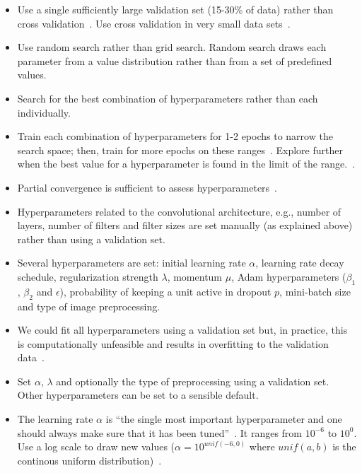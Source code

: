 \begin{itemize}
	\item Use a single sufficiently large validation set (15-30\% of data) rather than cross validation~\cite{Bengio2014}. Use cross validation in very small data sets~\cite{Ng2014}.

	\item Use random search rather than grid search. Random search draws each parameter from a value distribution rather than from a set of predefined values.~\cite{Bergstra2012}

	\item Search for the best combination of hyperparameters rather than each individually.

	\item Train each combination of hyperparameters for 1-2 epochs to narrow the search space; then, train for more epochs on these ranges~\cite{Karpathy2016}. Explore further when the best value for a hyperparameter is found in the limit of the range.~\cite{Bengio2012}.

	\item Partial convergence is sufficient to assess hyperparameters~\cite{Karpathy2016}.

	\item Hyperparameters related to the convolutional architecture, e.g., number of layers, number of filters and filter sizes are set manually (as explained above) rather than using a validation set.

	\item Several hyperparameters are set: initial learning rate $\alpha$, learning rate decay schedule, regularization strength $\lambda$, momentum $\mu$, Adam hyperparameters ($\beta_1$, $\beta_2$ and $\epsilon$), probability of keeping a unit active in dropout $p$, mini-batch size and type of image preprocessing.

	\item We could fit all hyperparameters using a validation set but, in practice, this is computationally unfeasible and results in overfitting to the validation data~\cite{Cawley2010}.

	\item Set $\alpha$, $\lambda$ and optionally the type of preprocessing using a validation set. Other hyperparameters can be set to a sensible default. 

	\item The learning rate $\alpha$ is ``the single most important hyperparameter and one should always make sure that it has been tuned''~\cite{Bengio2012}. It ranges from $10^{-6}$ to $10^{0}$. Use a log scale to draw new values ($\alpha = 10^{unif(-6, 0)}$ where $unif(a,b)$ is the continous uniform distribution)~\cite{Karpathy2016}.


\end{itemize}
